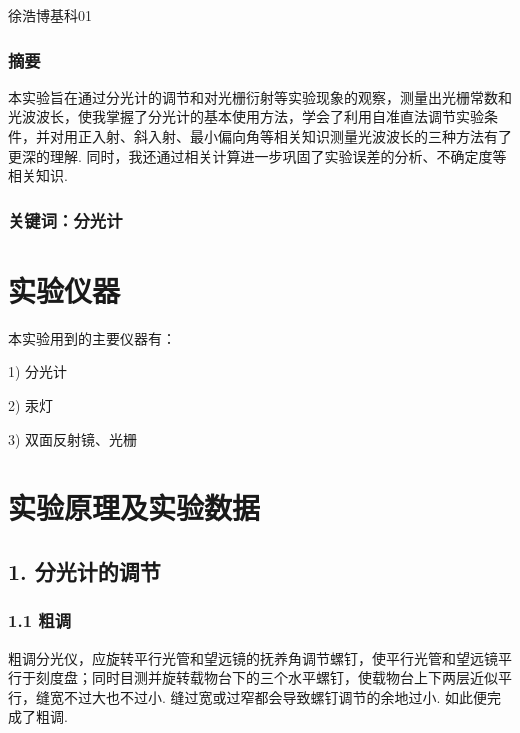 \documentclass[UTF8]{ctexart}
\begin{document}
\renewcommand{\thefootnote}{\fnsymbol{footnote}}
\linespread{1.4}
\title{\vspace{-5em}\vspace{-2.5em}}
\date{}
\maketitle
\begin{center}
{\fangsong 徐浩博\quad 基科01}
\end{center}

\subsubsection*{摘要}
{\kaishu\normalsize  本实验旨在通过分光计的调节和对光栅衍射等实验现象的观察，测量出光栅常数和光波波长，使我掌握了分光计的基本使用方法，学会了利用自准直法调节实验条件，并对用正入射、斜入射、最小偏向角等相关知识测量光波波长的三种方法有了更深的理解. 同时，我还通过相关计算进一步巩固了实验误差的分析、不确定度等相关知识.}
\subsubsection*{关键词：分光计\quad \vspace{1.5em}}

\section{实验仪器}
本实验用到的主要仪器有：\par
1) 分光计\par
2) 汞灯\par
3) 双面反射镜、光栅

\section{实验原理及实验数据}

\subsection*{ 1. 分光计的调节}
\subsubsection*{1.1 粗调}
粗调分光仪，应旋转平行光管和望远镜的抚养角调节螺钉，使平行光管和望远镜平行于刻度盘；同时目测并旋转载物台下的三个水平螺钉，使载物台上下两层近似平行，缝宽不过大也不过小. 缝过宽或过窄都会导致螺钉调节的余地过小. 如此便完成了粗调.
\end{document}
